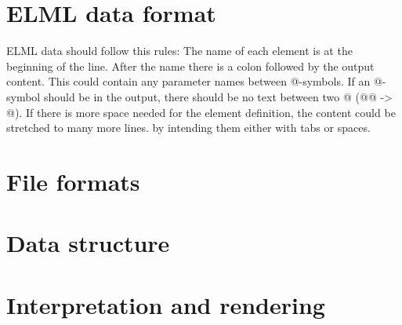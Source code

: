\documentclass[12pt,a4paper]{article}
\begin{document}
\section{ELML data format}

ELML data should follow this rules: The name of each element is at the beginning of the line. After the name there is a colon followed by the output content. This could contain any parameter names between @-symbols. If an @-symbol should be in the output, there should be no text between two @ (@@ -> @). If there is more space needed for the element definition, the content could be stretched to many more lines. by intending them either with tabs or spaces.

\section{File formats}

\section{Data structure}

\section{Interpretation and rendering}
\end{document}
